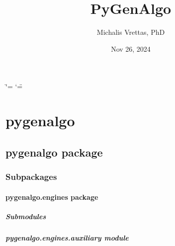 \documentclass[letterpaper,10pt,english]{sphinxmanual}
\title{PyGenAlgo}
\date{Nov 26, 2024}
\author{Michalis Vrettas, PhD}
\begin{document}
\ifdefined\shorthandoff
  \ifnum\catcode`\=\string=\active\shorthandoff{=}\fi
  \ifnum\catcode`\"=\active{}\fi
\fi

\pagestyle{empty}
\sphinxmaketitle
\pagestyle{plain}
\sphinxtableofcontents
\pagestyle{normal}
\label{\detokenize{index::doc}}


\sphinxstepscope


\chapter{pygenalgo}
\label{\detokenize{modules:pygenalgo}}\label{\detokenize{modules::doc}}
\sphinxstepscope


\section{pygenalgo package}
\label{\detokenize{pygenalgo:pygenalgo-package}}\label{\detokenize{pygenalgo::doc}}

\subsection{Subpackages}
\label{\detokenize{pygenalgo:subpackages}}
\sphinxstepscope


\subsubsection{pygenalgo.engines package}
\label{\detokenize{pygenalgo.engines:pygenalgo-engines-package}}\label{\detokenize{pygenalgo.engines::doc}}

\paragraph{Submodules}
\label{\detokenize{pygenalgo.engines:submodules}}

\paragraph{pygenalgo.engines.auxiliary module}
\label{\detokenize{pygenalgo.engines:module-pygenalgo.engines.auxiliary}}\label{\detokenize{pygenalgo.engines:pygenalgo-engines-auxiliary-module}}
\end{document}
